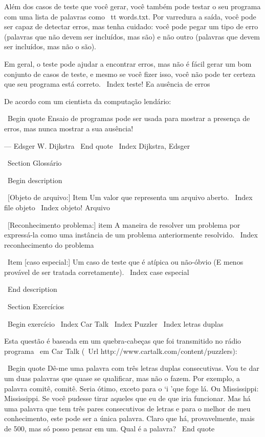 \documentclass[10pt]{book}
\begin{document}
{{{{{{Além dos casos de teste que você gerar, você também pode testar
o seu programa com uma lista de palavras como {\ tt words.txt}. Por varredura
a saída, você pode ser capaz de detectar erros, mas tenha cuidado:
você pode pegar um tipo de erro (palavras que não devem ser
incluídos, mas são) e não outro (palavras que devem ser incluídos,
mas não o são).

Em geral, o teste pode ajudar a encontrar erros, mas não é fácil
gerar um bom conjunto de casos de teste, e mesmo se você fizer isso, você não pode
ter certeza que seu programa está correto.
\ Index {teste! Ea ausência de erros}

De acordo com um cientista da computação lendário:

\ Begin {quote}
Ensaio de programas pode ser usada para mostrar a presença de erros, mas nunca
mostrar a sua ausência!

--- Edsger W. Dijkstra
\ End {quote}
\ Index {Dijkstra, Edsger}


\ Section {} Glossário

\ Begin {description}

\ [Objeto de arquivo:] Item Um valor que representa um arquivo aberto.
\ Index {file objeto}
\ Index {objeto! Arquivo}

\ [Reconhecimento problema:] item A maneira de resolver um problema por
expressá-la como uma instância de um problema anteriormente resolvido.
\ Index {reconhecimento do problema}

\ Item [caso especial:] Um caso de teste que é atípica ou não-óbvio
(E menos provável de ser tratada corretamente).
\ Index {case especial}

\ End {description}


\ Section {Exercícios}

\ Begin {} exercício
\ Index {Car Talk}
\ Index {} Puzzler
\ Index {letras duplas}

Esta questão é baseada em um quebra-cabeças que foi transmitido no rádio
programa {\ em Car Talk} 
(\ Url {http://www.cartalk.com/content/puzzlers}):

\ Begin {quote}
Dê-me uma palavra com três letras duplas consecutivas. Vou te dar um
duas palavras que quase se qualificar, mas não o fazem. Por exemplo, a palavra
comitê, comitê. Seria ótimo, exceto para o `i 'que
foge lá. Ou Mississippi: Mississippi. Se você pudesse
tirar aqueles que eu de que iria funcionar. Mas há uma palavra que tem três
pares consecutivos de letras e para o melhor de meu conhecimento, este pode
ser a única palavra. Claro que há, provavelmente, mais de 500, mas só posso
pensar em um. Qual é a palavra?
\ End {quote}

}}}}}}
\end{document}
